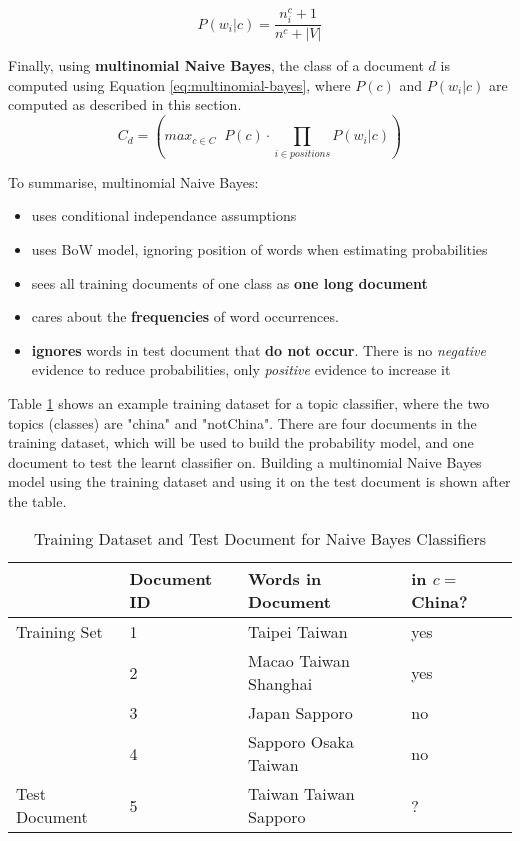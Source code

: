 \documentclass{article}
\begin{document}
\begin{equation}
	P(w_i|c) = \frac{n_i^c + 1}{n^c + |V|}
	\label{eq:naive-bayes-word-prob-smoothed}
\end{equation}

Finally, using \textbf{multinomial Naive Bayes}, the class of a document $d$ is computed using Equation \ref{eq:multinomial-bayes}, where $P(c)$ and $P(w_i|c)$ are computed as described in this section.
\begin{equation}
	C_{d} = \left( max_{c \in C} \;\; P(c) \cdot \prod_{i \in positions} P(w_i|c) \right)
	\label{eq:multinomial-bayes}
\end{equation}

To summarise, multinomial Naive Bayes:
\begin{itemize}
	\item uses conditional independance assumptions
	\item uses BoW model, ignoring position of words when estimating probabilities 
	\item sees all training documents of one class as \textbf{one long document}
	\item cares about the \textbf{frequencies} of word occurrences.
	\item \textbf{ignores} words in test document that \textbf{do not occur}. There is no \textit{negative} evidence to reduce probabilities, only \textit{positive} evidence to increase it
\end{itemize}

Table \ref{tab:example-naive-bayes} shows an example training dataset for a topic classifier, where the two topics (classes) are "china" and "notChina". There are four documents in the training dataset, which will be used to build the probability model, and one document to test the learnt classifier on. Building a multinomial Naive Bayes model using the training dataset and using it on the test document is shown after the table.

\begin{table}[H]
	\centering
	\begin{tabular}{|l|l|l|l|}
	\hline
	& \textbf{Document ID} & \textbf{Words in Document} & \textbf{in $c=$China?} \\
	\hline
	Training Set & 1 & Taipei Taiwan & yes \\
	& 2 & Macao Taiwan Shanghai & yes \\
	& 3 & Japan Sapporo & no \\
	& 4 & Sapporo Osaka Taiwan & no \\
	\hline
	Test Document & 5 & Taiwan Taiwan Sapporo & ? \\
	\hline 
	\end{tabular}
	\caption{Training Dataset and Test Document for Naive Bayes Classifiers}
	\label{tab:example-naive-bayes}
\end{table}
\end{document}
